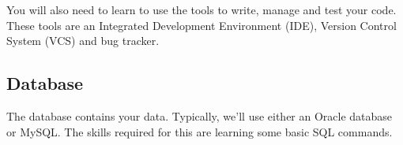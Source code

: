 You will also need to learn to use the tools to write, manage and test your code.  These tools are an Integrated Development Environment (IDE), Version Control System (VCS) and bug tracker.

\subsection{Database}

The database contains your data.  Typically, we'll use either an Oracle database or MySQL.  The skills required for this are learning some basic SQL commands.





